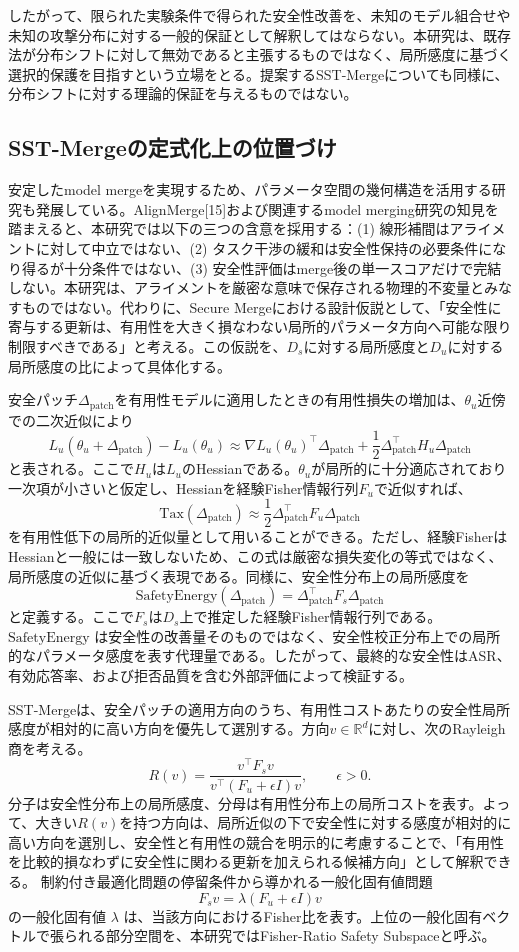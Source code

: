 \documentclass{article}
\begin{document}
したがって、限られた実験条件で得られた安全性改善を、未知のモデル組合せや未知の攻撃分布に対する一般的保証として解釈してはならない。本研究は、既存法が分布シフトに対して無効であると主張するものではなく、局所感度に基づく選択的保護を目指すという立場をとる。提案するSST-Mergeについても同様に、分布シフトに対する理論的保証を与えるものではない。

\subsection{SST-Mergeの定式化上の位置づけ}
安定したmodel mergeを実現するため、パラメータ空間の幾何構造を活用する研究も発展している。AlignMerge[15]および関連するmodel merging研究の知見を踏まえると、本研究では以下の三つの含意を採用する：(1) 線形補間はアライメントに対して中立ではない、(2) タスク干渉の緩和は安全性保持の必要条件になり得るが十分条件ではない、(3) 安全性評価はmerge後の単一スコアだけで完結しない。本研究は、アライメントを厳密な意味で保存される物理的不変量とみなすものではない。代わりに、Secure Mergeにおける設計仮説として、「安全性に寄与する更新は、有用性を大きく損なわない局所的パラメータ方向へ可能な限り制限すべきである」と考える。この仮説を、\(D_s\)に対する局所感度と\(D_u\)に対する局所感度の比によって具体化する。

安全パッチ\(\Delta_{\mathrm{patch}}\)を有用性モデルに適用したときの有用性損失の増加は、\(\theta_u\)近傍での二次近似により
\[
L_u(\theta_u+\Delta_{\mathrm{patch}})-L_u(\theta_u) \approx \nabla L_u(\theta_u)^\top \Delta_{\mathrm{patch}} + \frac{1}{2}\Delta_{\mathrm{patch}}^\top H_u\Delta_{\mathrm{patch}}
\]
と表される。ここで\(H_u\)は\(L_u\)のHessianである。\(\theta_u\)が局所的に十分適応されており一次項が小さいと仮定し、Hessianを経験Fisher情報行列\(F_u\)で近似すれば、
\[
\mathrm{Tax}(\Delta_{\mathrm{patch}}) \approx \frac{1}{2}\Delta_{\mathrm{patch}}^\top F_u\Delta_{\mathrm{patch}}
\]
を有用性低下の局所的近似量として用いることができる。ただし、経験FisherはHessianと一般には一致しないため、この式は厳密な損失変化の等式ではなく、局所感度の近似に基づく表現である。同様に、安全性分布上の局所感度を
\[
\mathrm{SafetyEnergy}(\Delta_{\mathrm{patch}}) = \Delta_{\mathrm{patch}}^\top F_s\Delta_{\mathrm{patch}}
\]
と定義する。ここで\(F_s\)は\(D_s\)上で推定した経験Fisher情報行列である。
\(\mathrm{SafetyEnergy}\) は安全性の改善量そのものではなく、安全性校正分布上での局所的なパラメータ感度を表す代理量である。したがって、最終的な安全性はASR、有効応答率、および拒否品質を含む外部評価によって検証する。

SST-Mergeは、安全パッチの適用方向のうち、有用性コストあたりの安全性局所感度が相対的に高い方向を優先して選別する。方向\(v \in \mathbb{R}^d\)に対し、次のRayleigh商を考える。
\[
R(v) = \frac{v^\top F_s v}{v^\top (F_u+\epsilon I)v}, \qquad \epsilon > 0.
\]
分子は安全性分布上の局所感度、分母は有用性分布上の局所コストを表す。よって、大きい\(R(v)\)を持つ方向は、局所近似の下で安全性に対する感度が相対的に高い方向を選別し、安全性と有用性の競合を明示的に考慮することで、「有用性を比較的損なわずに安全性に関わる更新を加えられる候補方向」として解釈できる。
制約付き最適化問題の停留条件から導かれる一般化固有値問題
\[
F_s v = \lambda(F_u+\epsilon I)v
\]
の一般化固有値 \(\lambda\) は、当該方向におけるFisher比を表す。上位の一般化固有ベクトルで張られる部分空間を、本研究ではFisher-Ratio Safety Subspaceと呼ぶ。
\end{document}
